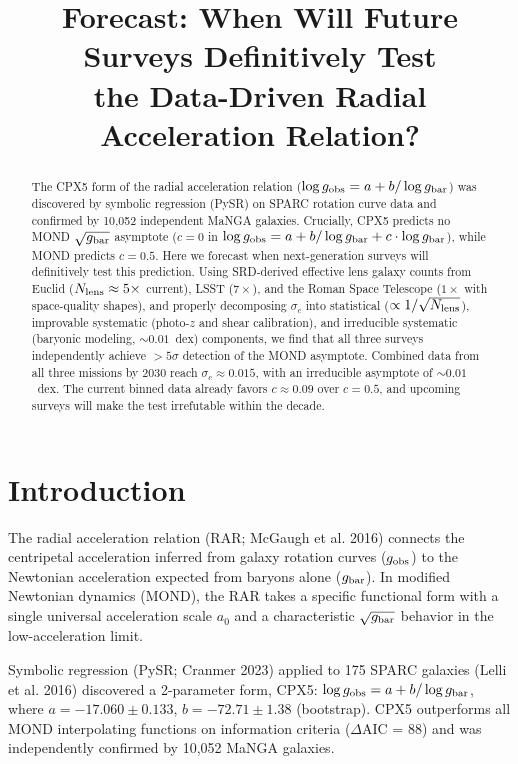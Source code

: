 \documentclass[twocolumn]{aastex631}
\begin{document}
\title{Forecast: When Will Future Surveys Definitively Test\\[3pt]
the Data-Driven Radial Acceleration Relation?}

\author{}

\begin{abstract}
The CPX5 form of the radial acceleration relation ($\log g_{\rm obs} = a +
b/\log g_{\rm bar}$) was discovered by symbolic regression (PySR) on
SPARC rotation curve data and confirmed by 10,052 independent MaNGA
galaxies.  Crucially, CPX5 predicts no MOND $\sqrt{g_{\rm bar}}$ asymptote
($c=0$ in $\log g_{\rm obs} = a + b/\log g_{\rm bar} + c\cdot\log
g_{\rm bar}$), while MOND predicts $c=0.5$.  Here we forecast when
next-generation surveys will definitively test this prediction.
Using SRD-derived effective lens galaxy counts from Euclid
($N_{\rm lens} \approx 5\times$ current), LSST ($7\times$), and the Roman
Space Telescope ($1\times$ with space-quality shapes), and properly
decomposing $\sigma_c$ into statistical ($\propto 1/\sqrt{N_{\rm lens}}$),
improvable systematic (photo-$z$ and shear calibration), and irreducible
systematic (baryonic modeling, $\sim0.01$~dex) components, we find that
all three surveys independently achieve $>5\sigma$ detection of the
MOND asymptote.  Combined data from all three missions by 2030 reach
$\sigma_c \approx 0.015$, with an irreducible asymptote of $\sim0.01$~dex.
The current binned data already favors $c\approx0.09$ over $c=0.5$,
and upcoming surveys will make the test irrefutable within the decade.
\end{abstract}

\section{Introduction}

The radial acceleration relation (RAR; McGaugh et al. 2016) connects the
centripetal acceleration inferred from galaxy rotation curves
($g_{\rm obs}$) to the Newtonian acceleration expected from baryons alone
($g_{\rm bar}$).  In modified Newtonian dynamics (MOND), the RAR takes a
specific functional form with a single universal acceleration scale $a_0$
and a characteristic $\sqrt{g_{\rm bar}}$ behavior in the low-acceleration
limit.

Symbolic regression (PySR; Cranmer 2023) applied to 175 SPARC galaxies
(Lelli et al. 2016) discovered a 2-parameter form, CPX5:
$\log g_{\rm obs} = a + b/\log g_{\rm bar}$, where $a = -17.060 \pm
0.133$, $b = -72.71 \pm 1.38$ (bootstrap).  CPX5 outperforms all MOND
interpolating functions on information criteria ($\Delta$AIC = 88) and
was independently confirmed by 10,052 MaNGA galaxies.
\end{document}
